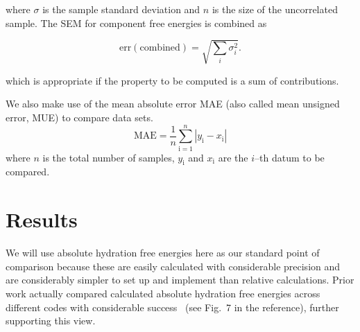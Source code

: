 \documentclass[journal=jctcce,manuscript=article]{achemso}
\begin{document}
where $\sigma$ is the sample standard deviation and $n$ is the size of
the uncorrelated sample.  The SEM for component free energies is combined as

\begin{equation}
  \label{eq:sem-comb}
  \mathrm{err}(\mathrm{combined}) = \sqrt{\sum_i \sigma_i^2}.
\end{equation}

which is appropriate if the property to be computed is a sum of
contributions.

We also make use of the mean absolute error MAE (also called mean unsigned 
error, MUE) to compare data sets.
\begin{equation}
\label{eq:MUE}
\mathrm{MAE} = \frac{1}{n}\sum_\mathrm{i=1}^n \left | y_\mathrm{i} - 
x_\mathrm{i} \right |
\end{equation}
where $n$ is the total number of samples, $y_\mathrm{i}$ and $x_\mathrm{i}$ are 
the $i$--th datum to be compared.


\section{Results}
\label{sec:results}

We will use absolute hydration free energies here as our standard point of 
comparison because these are easily calculated with considerable precision
\cite{doi:10.1021/acs.jced.7b00104} %
and are considerably simpler to set up and implement than relative calculations.
Prior work actually compared calculated absolute hydration free energies across 
different codes with considerable success~\cite{klimovich_predicting_2010} (see 
Fig.~7 in the reference), further supporting this view.
\end{document}
